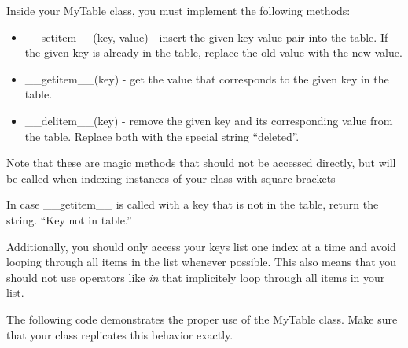\documentclass[11pt]{article}
\begin{document}
Inside your MyTable class, you must implement the following methods:

\begin{itemize}
\item
  \_\_setitem\_\_(key, value) - insert the given key-value pair into the
  table. If the given key is already in the table, replace the old value
  with the new value.
\item
  \_\_getitem\_\_(key) - get the value that corresponds to the given key
  in the table.
\item
  \_\_delitem\_\_(key) - remove the given key and its corresponding
  value from the table. Replace both with the special string
  ``deleted''.
\end{itemize}

Note that these are magic methods that should not be accessed directly,
but will be called when indexing instances of your class with square
brackets

In case \_\_getitem\_\_ is called with a key that is not in the table,
return the string. ``Key not in table.''

Additionally, you should only access your keys list one index at a time
and avoid looping through all items in the list whenever possible. This
also means that you should not use operators like \emph{in} that
implicitely loop through all items in your list.

The following code demonstrates the proper use of the MyTable class.
Make sure that your class replicates this behavior exactly.
\end{document}
